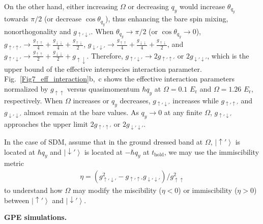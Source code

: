 \documentclass[showpacs,preprintnumbers,amsmath,amssymb, superscriptaddress, aps, reprint]{revtex4-1}
\def\E_r{E_{\text{r}}}
\def\thold{t_{\text{hold}}}
\begin{document}
{{{On the other hand, either increasing $\Omega$ or decreasing $q_y$ would increase $\theta_{q_y}$ towards $\pi/2$ (or decrease $\cos \theta_{q_y}$), thus enhancing the bare spin mixing, nonorthogonality and $g_{\uparrow'\downarrow'}$. When $\theta_{q_y}\rightarrow \pi/2$ (or $\cos \theta_{q_y}\rightarrow 0$), $g_{\uparrow'\uparrow'}\rightarrow\frac{g_{\uparrow\uparrow}}{4}+\frac{g_{\downarrow\downarrow}}{4}+\frac{g_{\uparrow\downarrow}}{2}$, $g_{\downarrow'\downarrow'}\rightarrow\frac{g_{\uparrow\uparrow}}{4}+\frac{g_{\downarrow\downarrow}}{4}+\frac{g_{\uparrow\downarrow}}{2}$, and $g_{\uparrow'\downarrow'}\rightarrow \frac{g_{\uparrow\uparrow}}{2}+\frac{g_{\downarrow\downarrow}}{2}+g_{\uparrow\downarrow}$. Therefore, $g_{\uparrow'\downarrow'}\rightarrow 2 g_{\uparrow'\uparrow'}$ or $2 g_{\downarrow'\downarrow'}$, which is the upper bound of the effective interspecies interaction parameter. {Fig.~{\ref{Fig7_eff_interaction}}b,~c} shows the effective interaction parameters normalized by $g_{\uparrow\uparrow}$ versus quasimomentum $\hbar q_y$ at $\Omega = 0.1$ $\E_r$ and $\Omega = 1.26$ $\E_r$, respectively. When $\Omega$ increases or $q_y$ decreases, $g_{\uparrow'\downarrow'}$ increases while $g_{\uparrow'\uparrow'}$ and $g_{\downarrow'\downarrow'}$ almost remain at the bare values. As $q_y\rightarrow 0$ at any finite $\Omega$, $g_{\uparrow'\downarrow'}$ approaches the upper limit $2g_{\uparrow'\uparrow'}$ or $2 g_{\downarrow'\downarrow'}$. 

In the case of SDM, assume that in the ground dressed band at $\Omega$, $\left|\uparrow'\right\rangle$ is located at $\hbar q_y$ and $\left|\downarrow'\right\rangle$ is located at $-\hbar q_y$ at $\thold$, we may use the immiscibility metric \cite{Ketterle_review_1999}
\begin{align}
\eta=(g_{\uparrow'\downarrow'}^2-g_{\uparrow'\uparrow'}g_{\downarrow'\downarrow'})/g_{\uparrow\uparrow}^2
\label{eq_immiscibility_metric}
\end{align}
to understand how $\Omega$ may modify the miscibility ($\eta<0$) or immiscibility ($\eta>0$) between $\left|\uparrow'\right\rangle$ and $\left|\downarrow'\right\rangle$.






\vspace{5mm}

\textbf{GPE simulations.} 

}}}
\end{document}
